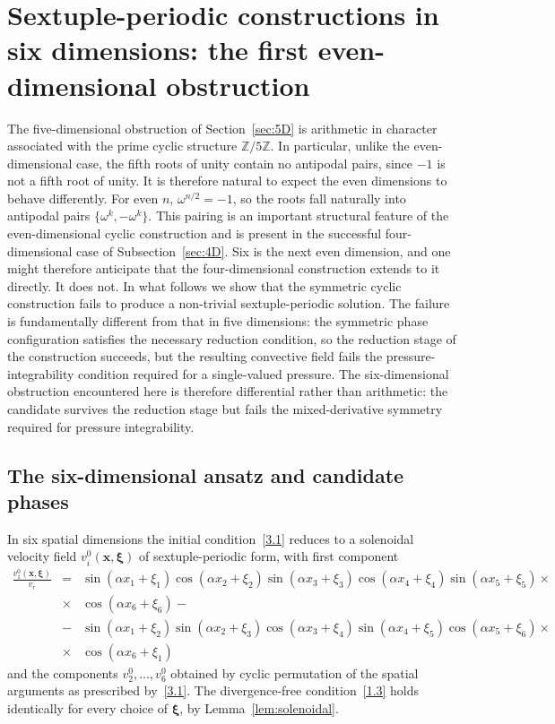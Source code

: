 \documentclass[11pt]{jfm}
\numberwithin{equation}{section}
\begin{document}
\section{Sextuple-periodic constructions in six dimensions: the first even-dimensional obstruction}
\label{sec:6D}
The five-dimensional obstruction of Section~\ref{sec:5D} is arithmetic in character
associated with the prime cyclic structure $\mathbb{Z}/5\mathbb{Z}$.
In particular, unlike the even-dimensional case, the fifth roots of
unity contain no antipodal pairs, since $-1$ is not a fifth root of unity.
It is therefore natural to expect the even dimensions to behave differently. For even $n$,
$\omega^{n/2}=-1$, so the roots fall naturally into antipodal pairs
$\{\omega^k,-\omega^k\}$. This pairing is an important structural feature of the
even-dimensional cyclic construction and is present in the successful four-dimensional case
of Subsection~\ref{sec:4D}. Six is the next even dimension, and one might therefore anticipate
that the four-dimensional construction extends to it directly. It does not. In what follows
we show that the symmetric cyclic construction fails to produce a non-trivial
sextuple-periodic solution. The failure is fundamentally different from that in five
dimensions: the symmetric phase configuration satisfies the necessary reduction condition,
so the reduction stage of the construction succeeds, but the resulting convective field fails
the pressure-integrability condition required for a single-valued pressure. The
six-dimensional obstruction encountered here is therefore differential rather than
arithmetic: the candidate survives the reduction stage but fails the mixed-derivative
symmetry required for pressure integrability.

\subsection{The six-dimensional ansatz and candidate phases}
In six spatial dimensions the initial condition~\eqref{3.1} reduces to a solenoidal velocity
field $v_i^0(\boldsymbol{x},\boldsymbol{\xi})$ of sextuple-periodic form, with first component
\begin{eqnarray}
\label{6.1}
\frac{v_1^0(\boldsymbol{x}, \boldsymbol{\xi})}{v_r}&=& \sin { \left(\alpha x_1+\xi_1 \right) } \cos {\left(\alpha x_2+\xi_2\right) }\sin { \left(\alpha x_3+\xi_3\right) } \cos { \left(\alpha x_4+\xi_4 \right) }\sin { \left(\alpha x_5+\xi_5\right) }\times\nonumber\\ &\times&\cos { \left(\alpha x_6+\xi_6 \right) }- \nonumber\\
&-&\sin  {\left( \alpha x_1+\xi_2\right) }\sin  {\left( \alpha x_2+\xi_3\right) } \cos  { \left(\alpha x_3+\xi_4 \right) } \sin  {\left( \alpha x_4+\xi_5\right) } \cos  { \left(\alpha x_5+\xi_6 \right) }\times\nonumber\\ &\times&\cos  { \left(\alpha x_6+\xi_1 \right) }
\end{eqnarray}
and the components $v_2^0,\dots,v_6^0$ obtained by cyclic permutation of the spatial arguments
as prescribed by~\eqref{3.1}. The divergence-free condition~\eqref{1.3} holds identically for every choice of $\boldsymbol{\xi}$, by Lemma~\ref{lem:solenoidal}.
\end{document}

